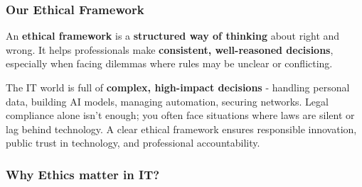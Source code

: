 \subsubsection{Our Ethical Framework}

\indent 

An \textbf{ethical framework} is a \textbf{structured way of thinking} about right and wrong. It helps professionals make \textbf{consistent, well-reasoned decisions}, especially when facing dilemmas where rules may be unclear or conflicting.

The IT world is full of \textbf{complex, high-impact decisions} - handling personal data, building AI models, managing automation, securing networks. Legal compliance alone isn’t enough; you often face situations where laws are silent or lag behind technology. A clear ethical framework ensures responsible innovation, public trust in technology, and professional accountability.

\subsubsection{Why Ethics matter in IT?}

\indent 

